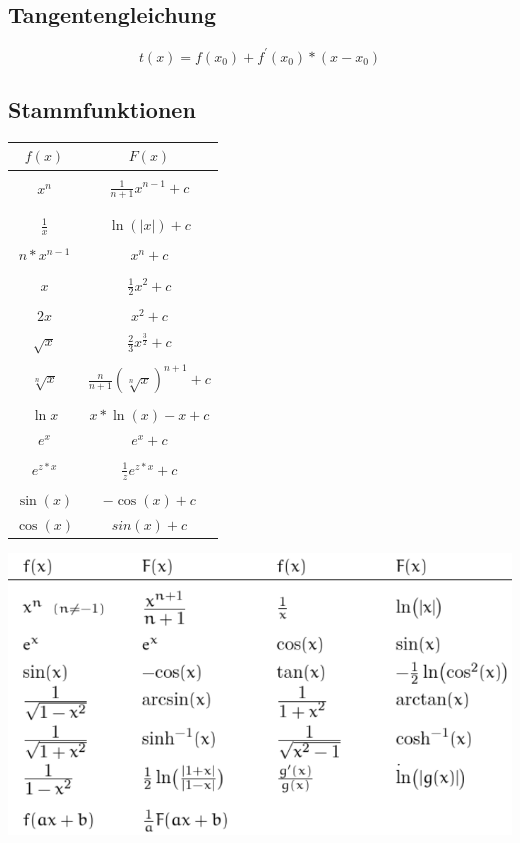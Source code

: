\documentclass[12pt,a4paper]{article}
\begin{document}
	\subsection{Tangentengleichung}
		$$t(x) = f(x_{0}) +f^{'}(x_{0})*(x-x_{0})$$

	\subsection{Stammfunktionen}
		\begin{minipage}[c]{.3\textwidth}
			\begin{tabular}{c|c}
				\hline
			   $f(x)$ & $F(x)$ \\
			   \hline\\
			   $x^{n}$ & $\frac{1}{n+1}x^{n-1}+c$ \\\\
			   \hline\\
			   $\frac{1}{x}$ & $\ln{(|x|)}+c$ \\\\
			   \hline
			   $n*x^{n-1}$ & $x^n + c$\\
			   \hline\\
			   $x$ & $\frac{1}{2}x^2+c$\\\\
			   \hline
			   $2x$ & $x^2+c$\\
			   \hline
			   $\sqrt{x}$ & $\frac{2}{3}x^{\frac{3}{2}} + c$\\
			   \hline\\
			   $\sqrt[n]{x}$ & $\frac{n}{n+1}(\sqrt[n]{x})^{n+1} + c$\\\\
			   \hline
			   $\ln{x}$ & $x*\ln{(x)} -x + c$\\
			   \hline
			   $e^x$ & $e^x + c$\\
			   \hline\\
			   $e^{z*x}$ & $\frac{1}{z}e^{z*x} + c$\\\\
			   \hline
			   $\sin{(x)}$ & $-\cos{(x)}+ c$\\
			   \hline
			   $\cos{(x)}$ & $sin{(x)} + c$\\
		   \end{tabular}
		\end{minipage}
		\begin{minipage}[c]{0.7\textwidth}
			\begin{center}
				\includegraphics[scale=0.8]{Bilder/Stammfunktionen.PNG}
			\end{center}
		\end{minipage}
\end{document}

